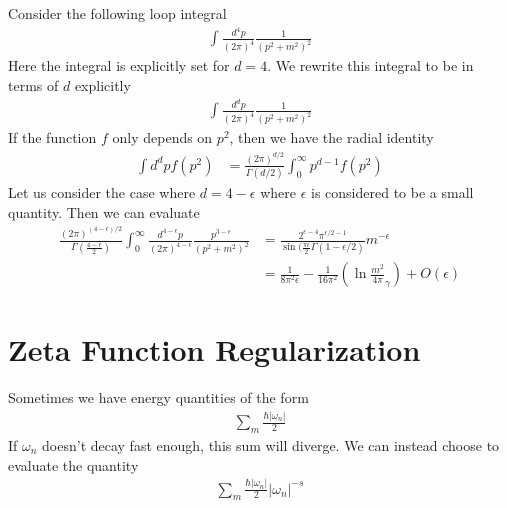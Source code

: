 \documentclass[book.tex]{subfiles}
\begin{document}
Consider the following loop integral
\begin{align}
    \int \frac{d^4 p}{(2\pi)^4} \frac{1}{(p^2 + m^2)^2}
\end{align}
Here the integral is explicitly set for $d=4$. We rewrite this integral to be in terms of $d$ explicitly
\begin{align}
\int \frac{d^d p}{(2\pi)^4} \frac{1}{(p^2 + m^2)^2}
\end{align}
If the function $f$ only depends on $p^2$, then we have the radial identity
\begin{align}
    \int d^d p f(p^2) &= \frac{(2\pi)^{d/2}}{\Gamma(d/2)} \int_0^\infty p^{d-1} f(p^2)
\end{align}
Let us consider the case where $d = 4 - \epsilon$ where $\epsilon$ is considered to be a small quantity. Then we can evaluate
\begin{align}
    \frac{(2\pi)^{(4-\epsilon)/2}}{\Gamma(\frac{4 - \epsilon}{2})} \int_0^\infty \frac{d^{4-\epsilon}p}{(2\pi)^{4-\epsilon}} \frac{p^{3-\epsilon}}{(p^2 +m^2)^2 } &= \frac{2^{\epsilon - 4}\pi^{\epsilon/2 -1}}{\sin(\frac{\pi \epsilon}{2}\Gamma(1 - \epsilon/2)} m^{-\epsilon} \\
    &= \frac{1}{8\pi^2\epsilon} - \frac{1}{16\pi^2} \left (\ln \frac{m^2}{4\pi} _ \gamma \right ) + O(\epsilon)
\end{align}
\section{Zeta Function Regularization}
Sometimes we have energy quantities of the form
\begin{align}
    \sum_m \frac{\hbar |\omega_n|}{2}
\end{align}
If $\omega_n$ doesn't decay fast enough, this sum will diverge. We can instead choose to evaluate the quantity
\begin{align}
    \sum_m \frac{\hbar |\omega_n|}{2}|\omega_n|^{-s}
\end{align}
\end{document}
